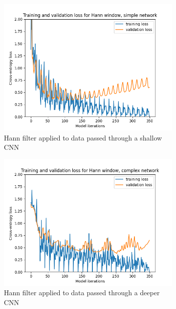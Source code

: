 \begin{figure}[hbt!]
    \begin{subfigure}[b]{0.5\textwidth}
        \includegraphics[width=\linewidth]{Images/hannSimple.png}
        \caption{Hann filter applied to data passed through a shallow CNN}
        \label{fig:HannShallow}
    \end{subfigure}
    \hfill
    \begin{subfigure}[b]{0.5\textwidth}
        \includegraphics[width=\linewidth]{Images/hannComplex.png}
        \caption{Hann filter applied to data passed through a deeper CNN}
        \label{fig:HannDeeper}
    \end{subfigure}
    \hfill
    \begin{subfigure}[b]{0.5\textwidth}

\end{subfigure}
\end{figure}
